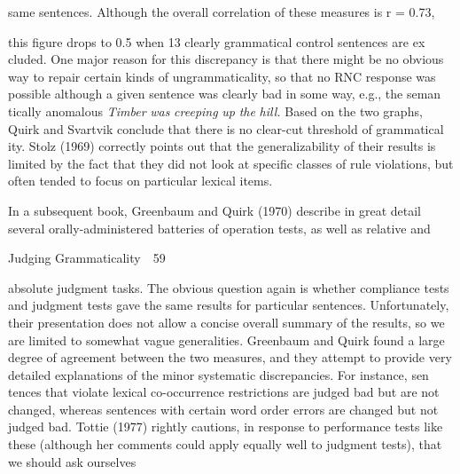\begin{styleTextbody}
same sentences. Although the overall correlation of these measures is r = 0.73,
\end{styleTextbody}


\begin{styleTextbody}
this figure drops to 0.5 when 13 clearly grammatical control sentences are ex\- cluded. One major reason for this discrepancy is that there might be no obvious way to repair certain kinds of ungrammaticality, so that no RNC response was possible although a given sentence was clearly bad in some way, e.g., the seman\- tically anomalous \textit{Timber}\textit{ }\textit{was}\textit{ }\textit{creeping}\textit{ }\textit{up}\textit{ }\textit{the}\textit{ }\textit{hill.}\textit{ }Based on the two graphs, Quirk and Svartvik conclude that there is no clear-cut threshold of grammatical\- ity. Stolz (1969) correctly points out that the generalizability of their results is limited by the fact that they did not look at specific classes of rule violations, but often tended to focus on particular lexical items.
\end{styleTextbody}


\begin{styleTextbody}
In a subsequent book, Greenbaum and Quirk (1970) describe in great detail several orally-administered batteries of operation tests, as well as relative and
\end{styleTextbody}


\clearpage\setcounter{page}{1}\begin{styleStandard}
Judging Grammaticality\ \ 59
\end{styleStandard}


\begin{styleTextbody}
absolute judgment tasks. The obvious question again is whether compliance tests and judgment tests gave the same results for particular sentences. Unfortunately, their presentation does not allow a concise overall summary of the results, so we are limited to somewhat vague generalities. Greenbaum and Quirk found a large degree of agreement between the two measures, and they attempt to provide very detailed explanations of the minor systematic discrepancies. For instance, sen\- tences that violate lexical co-occurrence restrictions are judged bad but are not changed, whereas sentences with certain word order errors are changed but not judged bad. Tottie (1977) rightly cautions, in response to performance tests like these (although her comments could apply equally well to judgment tests), that we should ask ourselves
\end{styleTextbody}


